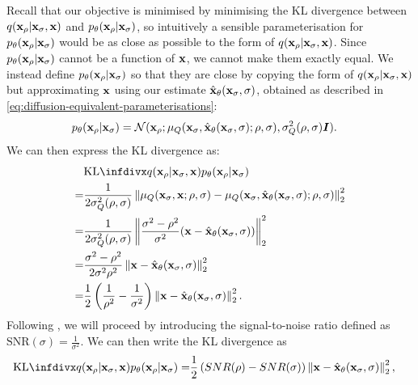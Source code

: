 Recall that our objective is minimised by minimising the KL divergence between $q({\mathbf{x}}_\rho|{\mathbf{x}}_\sigma,{\mathbf{x}})$ and $p_\theta({\mathbf{x}}_{\rho}|{\mathbf{x}}_{\sigma})$, so intuitively a sensible parameterisation for $p_\theta({\mathbf{x}}_\rho|{\mathbf{x}}_\sigma)$ would be as close as possible to the form of $q({\mathbf{x}}_\rho|{\mathbf{x}}_\sigma,{\mathbf{x}})$. Since $p_\theta({\mathbf{x}}_{\rho}|{\mathbf{x}}_{\sigma})$ cannot be a function of ${\mathbf{x}}$, we cannot make them exactly equal. We instead define $p_\theta({\mathbf{x}}_\rho|{\mathbf{x}}_\sigma)$ so that they are close by copying the form of $q({\mathbf{x}}_\rho|{\mathbf{x}}_\sigma,{\mathbf{x}})$ but approximating ${\mathbf{x}}$ using our estimate $\hat{{\mathbf{x}}}_\theta({\mathbf{x}}_\sigma, \sigma)$, obtained as described in \cref{eq:diffusion-equivalent-parameterisations}:
\begin{align} \label{eq:ddpm-transition}
    p_\theta({\mathbf{x}}_{\rho} | {\mathbf{x}}_{\sigma}) &= {\mathcal{N}}( {\mathbf{x}}_{\rho}; \mathbf{\mu}_Q({\mathbf{x}}_\sigma, \hat{{\mathbf{x}}}_\theta({\mathbf{x}}_\sigma, \sigma); \rho, \sigma), \sigma_Q^2(\rho, \sigma) {\bm{I}} ).
\end{align}
We can then express the KL divergence as:
\begin{align}
    &\kl{q(\rvx_{\rho} | \rvx_{\sigma}, \rvx)}{p_\theta(\rvx_{\rho} | \rvx_{\sigma})} \\ 
    = &\frac{1}{2 \sigma_Q^2(\rho, \sigma)} \left\| \mathbf{\mu}_Q(\rvx_\sigma, \rvx; \rho, \sigma) - \mathbf{\mu}_Q(\rvx_\sigma, \predx_\theta(\rvx_\sigma, \sigma); \rho, \sigma) \right\|_2^2 \\
    = &\frac{1}{2 \sigma_Q^2(\rho, \sigma)} \left\| \frac{\sigma^2-\rho^2}{\sigma^2} ( \rvx - \predx_\theta(\rvx_\sigma, \sigma) ) \right\|_2^2 \\
    = &\frac{\sigma^2-\rho^2}{2 \sigma^2 \rho^2} \left\| \rvx - \predx_\theta(\rvx_\sigma, \sigma) \right\|_2^2 \\
    = &\frac{1}{2} \left( \frac{1}{\rho^2} - \frac{1}{\sigma^2} \right) \left\| \rvx - \predx_\theta(\rvx_\sigma, \sigma) \right\|_2^2.
\end{align}
Following \citet{kingma2021variational}, we will proceed by introducing the signal-to-noise ratio defined as $\text{SNR}(\sigma) = \frac{1}{\sigma^2}$. We can then write the KL divergence as
\begin{align}
\kl{q(\rvx_{\rho} | \rvx_{\sigma}, \rvx)}{p_\theta(\rvx_{\rho} | \rvx_{\sigma})} = &\frac{1}{2} \left( SNR(\rho) - SNR(\sigma) \right) \left\| \rvx - \predx_\theta(\rvx_\sigma, \sigma) \right\|_2^2,
\end{align}
